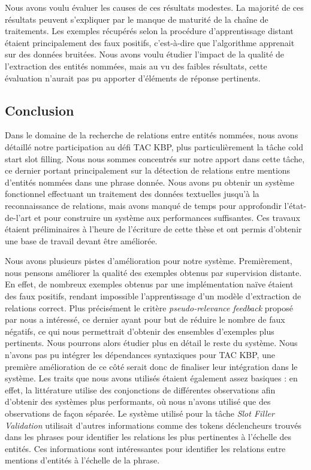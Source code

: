 \documentclass[12pt,a4paper,times,twoside,openright]{report}
\begin{document}
Nous avons voulu évaluer les causes de ces résultats modestes. La majorité de ces résultats peuvent s'expliquer par le manque de maturité de la chaîne de traitements. Les exemples récupérés selon la procédure d'apprentissage distant étaient principalement des faux positifs, c'est-à-dire que l'algorithme apprenait sur des données bruitées. Nous avons voulu étudier l'impact de la qualité de l'extraction des entités nommées, mais au vu des faibles résultats, cette évaluation n'aurait pas pu apporter d'éléments de réponse pertinents.



        \subsection{Conclusion}
        \label{sec:imm-conclusion}
Dans le domaine de la recherche de relations entre entités nommées, nous avons détaillé notre participation au défi TAC KBP, plus particulièrement la tâche cold start slot filling. Nous nous sommes concentrés sur notre apport dans cette tâche, ce dernier portant principalement sur la détection de relations entre mentions d'entités nommées dans une phrase donnée. Nous avons pu obtenir un système fonctionnel effectuant un traitement des données textuelles jusqu'à la reconnaissance de relations, mais avons manqué de temps pour approfondir l'état-de-l'art et pour construire un système aux performances suffisantes. Ces travaux étaient préliminaires à l'heure de l'écriture de cette thèse et ont permis d'obtenir une base de travail devant être améliorée.

Nous avons plusieurs pistes d'amélioration pour notre système. Premièrement, nous pensons améliorer la qualité des exemples obtenus par supervision distante. En effet, de nombreux exemples obtenus par une implémentation naïve étaient des faux positifs, rendant impossible l'apprentissage d'un modèle d'extraction de relations correct. Plus précisément le critère \textit{pseudo-relevance feedback} proposé par \citet{xu2013filling} nous a intéressé, ce dernier ayant pour but de réduire le nombre de faux négatifs, ce qui nous permettrait d'obtenir des ensembles d'exemples plus pertinents. Nous pourrons alors étudier plus en détail le reste du système. Nous n'avons pas pu intégrer les dépendances syntaxiques pour TAC KBP, une première amélioration de ce côté serait donc de finaliser leur intégration dans le système. Les traits que nous avons utilisés étaient également assez basiques : en effet, la littérature utilise des conjonctions de différentes observations afin d'obtenir des systèmes plus performants, où nous n'avons utilisé que des observations de façon séparée. Le système utilisé pour la tâche \textit{Slot Filler Validation} utilisait d'autres informations comme des tokens déclencheurs trouvés dans les phrases pour identifier les relations les plus pertinentes à l'échelle des entités. Ces informations sont intéressantes pour identifier les relations entre mentions d'entités à l'échelle de la phrase.
\end{document}

